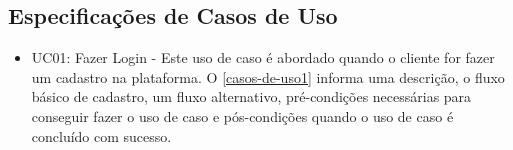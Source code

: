 
\begin{apendicesenv}
	
	\partapendices
	
	\chapter{Especificações de Casos de Uso}
	\label{casos-de-uso-especificacao}
	
	
	\begin{itemize}
		\item UC01: Fazer Login - Este uso de caso é abordado quando o cliente for fazer um cadastro na plataforma. O \autoref{casos-de-uso1} informa uma descrição, o fluxo básico de cadastro, um fluxo alternativo, pré-condições necessárias para conseguir fazer o uso de caso e pós-condições quando o uso de caso é concluído com sucesso.\\			
	\end{itemize}


\end{apendicesenv}
